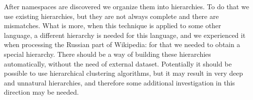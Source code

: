 After namespaces are discovered we organize them into hierarchies. 
To do that we use existing hierarchies, but they are not always complete 
and there are mismatches. What is more, when this technique is applied to some 
other language, a different hierarchy is needed for this language, and we experienced 
it when processing the Russian part of Wikipedia: for that we needed to obtain 
a special hierarchy. There should be a way of building these hierarchies
automatically, without the need of external dataset.
Potentially it should be possible to use hierarchical clustering 
algorithms, but it may result in very deep and unnatural hierarchies, and 
therefore some additional investigation in this direction may be needed. 
